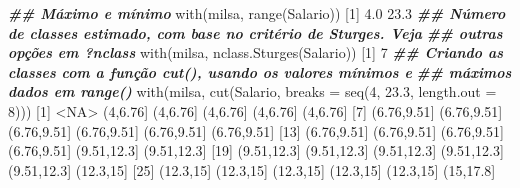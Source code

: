 \documentclass[
  10pt,
  a4paper]{book}
\newenvironment{Shaded}{\begin{snugshade}}{\end{snugshade}}
\newcommand{\AttributeTok}[1]{\textcolor[rgb]{0.77,0.63,0.00}{#1}}
\newcommand{\ConstantTok}[1]{\textcolor[rgb]{0.00,0.00,0.00}{#1}}
\newcommand{\DecValTok}[1]{\textcolor[rgb]{0.00,0.00,0.81}{#1}}
\newcommand{\DocumentationTok}[1]{\textcolor[rgb]{0.56,0.35,0.01}{\textbf{\textit{#1}}}}
\newcommand{\FloatTok}[1]{\textcolor[rgb]{0.00,0.00,0.81}{#1}}
\newcommand{\FunctionTok}[1]{\textcolor[rgb]{0.00,0.00,0.00}{#1}}
\newcommand{\NormalTok}[1]{#1}
\newcommand{\SpecialCharTok}[1]{\textcolor[rgb]{0.00,0.00,0.00}{#1}}
\begin{document}
\begin{Shaded}
\begin{Highlighting}[]
\DocumentationTok{\#\# Máximo e mínimo}
\FunctionTok{with}\NormalTok{(milsa, }\FunctionTok{range}\NormalTok{(Salario))}
\NormalTok{[}\DecValTok{1}\NormalTok{]  }\FloatTok{4.0} \FloatTok{23.3}
\DocumentationTok{\#\# Número de classes estimado, com base no critério de Sturges. Veja}
\DocumentationTok{\#\# outras opções em ?nclass}
\FunctionTok{with}\NormalTok{(milsa, }\FunctionTok{nclass.Sturges}\NormalTok{(Salario))}
\NormalTok{[}\DecValTok{1}\NormalTok{] }\DecValTok{7}
\DocumentationTok{\#\# Criando as classes com a função cut(), usando os valores mínimos e}
\DocumentationTok{\#\# máximos dados em range()}
\FunctionTok{with}\NormalTok{(milsa, }\FunctionTok{cut}\NormalTok{(Salario, }\AttributeTok{breaks =} \FunctionTok{seq}\NormalTok{(}\DecValTok{4}\NormalTok{, }\FloatTok{23.3}\NormalTok{, }\AttributeTok{length.out =} \DecValTok{8}\NormalTok{)))}
\NormalTok{ [}\DecValTok{1}\NormalTok{] }\SpecialCharTok{\textless{}}\ConstantTok{NA}\SpecialCharTok{\textgreater{}}\NormalTok{        (}\DecValTok{4}\NormalTok{,}\FloatTok{6.76}\NormalTok{]    (}\DecValTok{4}\NormalTok{,}\FloatTok{6.76}\NormalTok{]    (}\DecValTok{4}\NormalTok{,}\FloatTok{6.76}\NormalTok{]    (}\DecValTok{4}\NormalTok{,}\FloatTok{6.76}\NormalTok{]    (}\DecValTok{4}\NormalTok{,}\FloatTok{6.76}\NormalTok{]   }
\NormalTok{ [}\DecValTok{7}\NormalTok{] (}\FloatTok{6.76}\NormalTok{,}\FloatTok{9.51}\NormalTok{] (}\FloatTok{6.76}\NormalTok{,}\FloatTok{9.51}\NormalTok{] (}\FloatTok{6.76}\NormalTok{,}\FloatTok{9.51}\NormalTok{] (}\FloatTok{6.76}\NormalTok{,}\FloatTok{9.51}\NormalTok{] (}\FloatTok{6.76}\NormalTok{,}\FloatTok{9.51}\NormalTok{] (}\FloatTok{6.76}\NormalTok{,}\FloatTok{9.51}\NormalTok{]}
\NormalTok{[}\DecValTok{13}\NormalTok{] (}\FloatTok{6.76}\NormalTok{,}\FloatTok{9.51}\NormalTok{] (}\FloatTok{6.76}\NormalTok{,}\FloatTok{9.51}\NormalTok{] (}\FloatTok{6.76}\NormalTok{,}\FloatTok{9.51}\NormalTok{] (}\FloatTok{6.76}\NormalTok{,}\FloatTok{9.51}\NormalTok{] (}\FloatTok{9.51}\NormalTok{,}\FloatTok{12.3}\NormalTok{] (}\FloatTok{9.51}\NormalTok{,}\FloatTok{12.3}\NormalTok{]}
\NormalTok{[}\DecValTok{19}\NormalTok{] (}\FloatTok{9.51}\NormalTok{,}\FloatTok{12.3}\NormalTok{] (}\FloatTok{9.51}\NormalTok{,}\FloatTok{12.3}\NormalTok{] (}\FloatTok{9.51}\NormalTok{,}\FloatTok{12.3}\NormalTok{] (}\FloatTok{9.51}\NormalTok{,}\FloatTok{12.3}\NormalTok{] (}\FloatTok{9.51}\NormalTok{,}\FloatTok{12.3}\NormalTok{] (}\FloatTok{12.3}\NormalTok{,}\DecValTok{15}\NormalTok{]  }
\NormalTok{[}\DecValTok{25}\NormalTok{] (}\FloatTok{12.3}\NormalTok{,}\DecValTok{15}\NormalTok{]   (}\FloatTok{12.3}\NormalTok{,}\DecValTok{15}\NormalTok{]   (}\FloatTok{12.3}\NormalTok{,}\DecValTok{15}\NormalTok{]   (}\FloatTok{12.3}\NormalTok{,}\DecValTok{15}\NormalTok{]   (}\FloatTok{12.3}\NormalTok{,}\DecValTok{15}\NormalTok{]   (}\DecValTok{15}\NormalTok{,}\FloatTok{17.8}\NormalTok{]  }

\end{Highlighting}
\end{Shaded}
\end{document}
